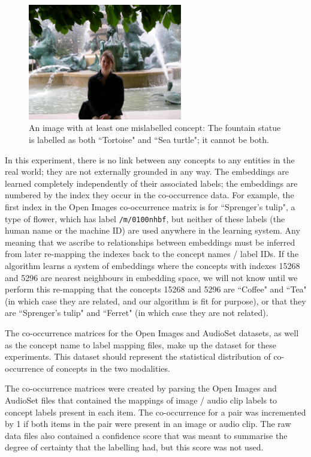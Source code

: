 \begin{figure}[H]
\label{fig:tortoiseseaturtle}
    \centering
    \includegraphics[width=0.6\textwidth]{images/method/tortoise_seaturtle.jpg}
    \caption{
        An image with at least one mislabelled concept: The fountain statue is labelled as both ``Tortoise" and ``Sea turtle"; it cannot be both. 
    }
\end{figure}

In this experiment, there is no link between any concepts to any entities in the real world; they are not externally grounded in any way. The embeddings are learned completely independently of their associated labels; the embeddings are numbered by the index they occur in the co-occurrence data. For example, the first index in the Open Images co-occurrence matrix is for ``Sprenger's tulip", a type of flower, which has label \texttt{/m/0100nhbf}, but neither of these labels (the human name or the machine ID) are used anywhere in the learning system. Any meaning that we ascribe to relationships between embeddings must be inferred from later re-mapping the indexes back to the concept names / label IDs. If the algorithm learns a system of embeddings where the concepts with indexes 15268 and 5296 are nearest neighbours in embedding space, we will not know until we perform this re-mapping that the concepts 15268 and 5296 are ``Coffee" and ``Tea" (in which case they are related, and our algorithm is fit for purpose), or that they are ``Sprenger's tulip" and ``Ferret" (in which case they are not related). 

The co-occurrence matrices for the Open Images and AudioSet datasets, as well as the concept name to label mapping files, make up the dataset for these experiments. This dataset should represent the statistical distribution of co-occurrence of concepts in the two modalities. 

The co-occurrence matrices were created by parsing the Open Images and AudioSet files that contained the mappings of image / audio clip labels to concept labels present in each item. The co-occurrence for a pair was incremented by 1 if both items in the pair were present in an image or audio clip. The raw data files also contained a confidence score that was meant to summarise the degree of certainty that the labelling had, but this score was not used. 

